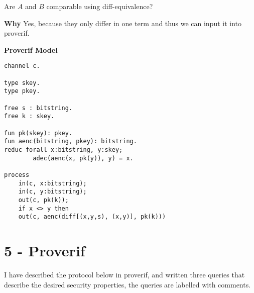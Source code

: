 \documentclass{article}
\begin{document}
Are $A$ and $B$ comparable using diff-equivalence?

\textbf{Why}
Yes, because they only differ in one term and thus we can input it into proverif.

\textbf{Proverif Model}

\begin{lstlisting}
channel c.

type skey.
type pkey.

free s : bitstring.
free k : skey.

fun pk(skey): pkey.
fun aenc(bitstring, pkey): bitstring.
reduc forall x:bitstring, y:skey;
		adec(aenc(x, pk(y)), y) = x.

process
	in(c, x:bitstring);
	in(c, y:bitstring);
	out(c, pk(k));
	if x <> y then
	out(c, aenc(diff[(x,y,s), (x,y)], pk(k)))
\end{lstlisting}

\section*{5 - Proverif}

I have described the protocol below in proverif, and written three queries that describe the desired security properties, the queries are labelled with comments.
\end{document}
